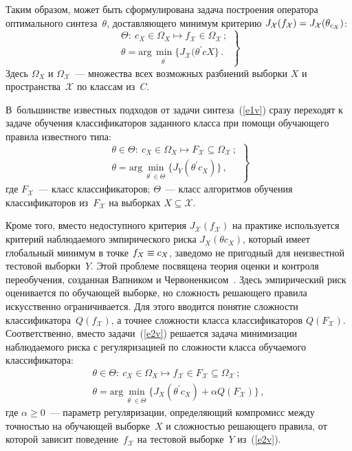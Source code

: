 \begin{multicols}{2}
Таким образом, может быть сформулирована задача построения оператора оптимального 
синтеза~$\theta$, доставляющего минимум критерию 
$J_{\mathcal{X}}(f_{\mathcal{X}})\hm=J_{\mathcal{X}}(\theta_{c_X})$:
\begin{equation}
\left.
\begin{array}{l}
\Theta:\ c_X\in \Omega_X\mapsto f_{\mathcal{X}}\in\Omega_{\mathcal{X}}\,;\\[9pt]
\theta=\mathrm{arg}\,\min\limits_{\theta^\prime} \{J_{\mathcal{X}}(\theta^\prime c{X}\}\,.
\end{array}
\right\}
\label{e1v}
\end{equation}
Здесь $\Omega_X$ и $\Omega_{\mathcal{X}}$~--- множества всех возможных разбиений выборки 
$X$ и пространства~$\mathcal{X}$ по классам из~$C$.

В~большинстве известных подходов от задачи синтеза~(\ref{e1v}) сразу переходят к задаче 
обучения классификаторов заданного класса при помощи обучающего правила известного типа:
\begin{equation}
\left.
\begin{array}{l}
\theta \in \Theta:\ c_X\in \Omega_X\mapsto F_{\mathcal{X}}\subseteq 
\Omega_{\mathcal{X}}\,;\\[9pt]
\theta = \mathrm{arg}\,\min\limits_{\theta^\prime \in \Theta} \{ J_Y(\theta^\prime c_X)\}\,,
\end{array}
\right\}
\label{e2v}
\end{equation}
где $F_{\mathcal{X}}$~--- класс классификаторов; $\Theta$~--- класс алгоритмов обучения 
классификаторов из~$F_{\mathcal{X}}$ на выборках $X\subseteq \mathcal{X}$. 

Кроме того, вместо недоступного критерия $J_{\mathcal{X}}(f_{\mathcal{X}})$ на практике 
используется критерий наблюдаемого эмпирического риска $J_X(\theta c_X)$, который имеет 
глобальный минимум в точке $f_X\hm\equiv c_X$, заведомо не пригодный для неизвестной 
тестовой выборки~$Y$. Этой проблеме посвящена теория оценки и контроля переобучения, 
созданная Вапником и Червоненкисом~\cite{2v}. Здесь эмпирический риск оценивается по 
обучающей выборке, но сложность решающего правила искусственно ограничивается. Для этого 
вводится понятие сложности классификатора~$Q(f_{\mathcal{X}})$, а точнее сложности класса 
классификаторов $Q(F_{\mathcal{X}})$. Соответственно, вместо задачи~(\ref{e2v}) решается 
задача минимизации наблюдаемого риска с регуляризацией по сложности класса обучаемого 
классификатора:
\begin{gather*}
\theta \in \Theta:\ c_X\in\Omega_X\mapsto f_{\mathcal{X}}\in F_{\mathcal{X}}\subseteq 
\Omega_{\mathcal{X}}\,;\\
\theta = \mathrm{arg}\,\min\limits_{\theta^\prime\in \Theta} \{J_X(\theta^\prime c_X)+\alpha 
Q(F_{\mathcal{X}})\}\,,
\end{gather*}
где $\alpha \geq 0$~--- параметр регуляризации, опре\-де\-ля\-ющий компромисс между точностью на 
обучающей выборке~$X$ и сложностью решающего правила, от которой зависит 
поведение~$f_{\mathcal{X}}$ на тестовой выборке~$Y$ из~(\ref{e2v}).


\end{multicols}
